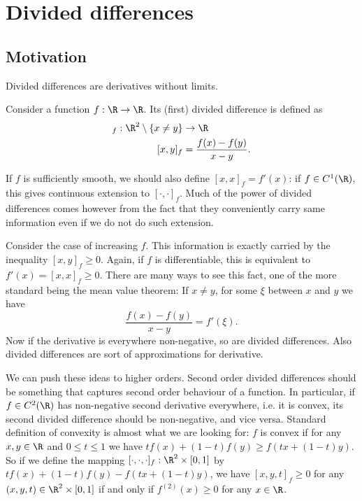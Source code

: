 \chapter{Divided differences}

\section{Motivation}
Divided differences are derivatives without limits.

Consider a function $f : \R \to \R$. Its (first) divided difference is defined as
\begin{align*}
	[\cdot , \cdot]_{f} : \R^{2} \setminus \{x \neq y\} &\to \R \\
	[x, y]_{f} &= \frac{f(x) - f(y)}{x - y}.
\end{align*}

If $f$ is sufficiently smooth, we should also define $[x, x]_{f} = f'(x)$: if $f \in C^{1}(\R)$, this gives continuous extension to $[\cdot, \cdot]_{f}$. Much of the power of divided differences comes however from the fact that they conveniently carry same information even if we do not do such extension.

Consider the case of increasing $f$. This information is exactly carried by the inequality $[x, y]_{f} \geq 0$. Again, if $f$ is differentiable, this is equivalent to $f'(x) = [x, x]_{f} \geq 0$. There are many ways to see this fact, one of the more standard being the mean value theorem: If $x \neq y$, for some $\xi$ between $x$ and $y$ we have
\[
	\frac{f(x) - f(y)}{x - y} = f'(\xi).
\]
Now if the derivative is everywhere non-negative, so are divided differences. Also divided differences are sort of approximations for derivative.

We can push these ideas to higher orders. Second order divided differences should be something that captures second order behaviour of a function. In particular, if $f \in C^{2}(\R)$ has non-negative second derivative everywhere, i.e. it is convex, its second divided difference should be non-negative, and vice versa. Standard definition of convexity is almost what we are looking for: $f$ is convex if for any $x, y \in \R$ and $0 \leq t \leq 1$ we have $t f(x) + (1 - t) f(y) \geq f(t x + (1 - t)y)$. So if we define the mapping $[\cdot, \cdot, \cdot]_{f} : \R^{2} \times [0, 1]$ by $t f(x) + (1 - t) f(y) - f(t x + (1 - t)y)$, we have $[x, y, t]_{f} \geq 0$ for any $(x, y, t) \in \R^{2} \times [0, 1]$ if and only if $f^{(2)}(x) \geq 0$ for any $x \in \R$.

